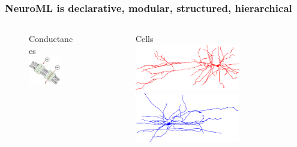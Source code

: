 \begin{frame}[c]
  \frametitle{NeuroML is declarative, modular, structured, hierarchical}
  \begin{columns}
    \begin{column}{0.3\textwidth}
      \begin{figure}[h]
        \centering
        Conductances\\
        \includegraphics[width=0.7\textwidth]{99_images/membrane2}\\\vspace{0.2cm}
      \end{figure}%
    \end{column}
    \begin{column}{0.3\textwidth}
      \begin{figure}[h]
        \centering
        Cells\\\vspace{-0.5cm}
        \includegraphics[width=0.7\textwidth,angle=-90]{99_images/HL23PYR-red}
        \includegraphics[width=0.7\textwidth,angle=-90]{99_images/HL23PV}

\end{figure}
\end{column}
\end{columns}
\end{frame}
